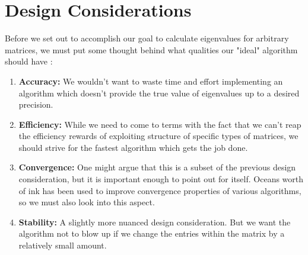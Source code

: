 \section{Design Considerations}
Before we set out to accomplish our goal to calculate eigenvalues for arbitrary matrices, we must put some thought behind what qualities our "ideal" algorithm should have :
\begin{enumerate}
    \item \textbf{Accuracy:} We wouldn't want to waste time and effort implementing an algorithm which doesn't provide the true value of eigenvalues up to a desired precision.

    \item \textbf{Efficiency:} While we need to come to terms with the fact that we can't reap the efficiency rewards of exploiting structure of specific types of matrices, we should strive for the fastest algorithm which gets the job done.
    \item \textbf{Convergence:} One might argue that this is a subset of the previous design consideration, but it is important enough to point out for itself. Oceans worth of ink has been used to improve convergence properties of various algorithms, so we must also look into this aspect.
    \item \textbf{Stability:} A slightly more nuanced design consideration. But we want the algorithm not to blow up if we change the entries within the matrix by a relatively small amount.

\end{enumerate}
